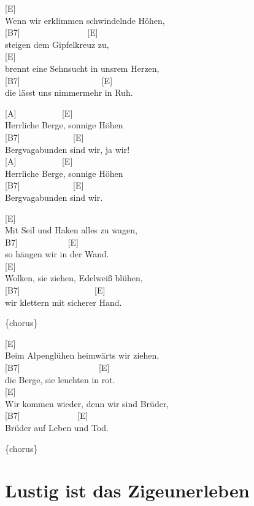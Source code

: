 \documentclass[
  letterpaper,
  twoside=false]{scrbook}
\begin{document}
{[}E{]}\\
Wenn wir erklimmen schwindelnde Höhen,\\
{[}B7{]} ~ ~ ~ ~ ~ ~ ~ ~ ~ {[}E{]}\\
steigen dem Gipfelkreuz zu,\\
{[}E{]}\\
brennt eine Sehnsucht in uns\textquotesingle rem Herzen,\\
{[}B7{]} ~ ~ ~ ~ ~ ~ ~ ~ ~ ~ ~ {[}E{]}\\
die lässt uns nimmermehr in Ruh.

{[}A{]} ~ ~ ~ ~ ~ ~ {[}E{]}\\
Herrliche Berge, sonnige Höhen\\
{[}B7{]} ~ ~ ~ ~ ~ ~ ~ {[}E{]}\\
Bergvagabunden sind wir, ja wir!\\
{[}A{]} ~ ~ ~ ~ ~ ~ {[}E{]}\\
Herrliche Berge, sonnige Höhen\\
{[}B7{]} ~ ~ ~ ~ ~ ~ ~ {[}E{]}\\
Bergvagabunden sind wir.

{[}E{]} ~ ~ ~\\
Mit Seil und Haken alles zu wagen,\\
\hspace*{0.333em}{[}B7{]} ~ ~ ~ ~ ~ ~ ~{[}E{]}\\
so hängen wir in der Wand.\\
{[}E{]} ~ ~\\
Wolken, sie ziehen, Edelweiß blühen,\\
{[}B7{]} ~ ~ ~ ~ ~ ~ ~ ~ ~ ~ {[}E{]}\\
wir klettern mit sicherer Hand.

\{chorus\}

{[}E{]}\\
Beim Alpenglühen heimwärts wir ziehen,\\
{[}B7{]} ~ ~ ~ ~ ~ ~ ~ ~ ~ ~ ~{[}E{]}\\
die Berge, sie leuchten in rot.\\
{[}E{]} ~ ~ ~ ~ ~ ~ ~ ~ ~\\
Wir kommen wieder, denn wir sind Brüder,\\
{[}B7{]} ~ ~ ~ ~ ~ ~ ~ ~{[}E{]}\\
Brüder auf Leben und Tod.

\{chorus\}

\hypertarget{lustig-ist-das-zigeunerleben}{%
\chapter{Lustig ist das
Zigeunerleben}\label{lustig-ist-das-zigeunerleben}}
\end{document}
